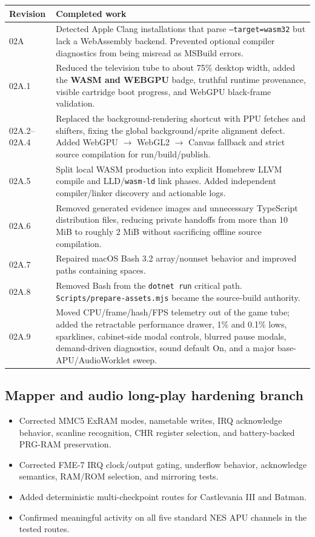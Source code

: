 \documentclass[10pt,letterpaper]{article}
\newcommand{\code}[1]{\texttt{\small #1}}
\begin{document}
\begin{longtable}{p{1.05in}p{6.2in}}
\toprule
Revision & Completed work \\
\midrule
\endhead
02A & Detected Apple Clang installations that parse \code{--target=wasm32} but lack a WebAssembly backend. Prevented optional compiler diagnostics from being misread as MSBuild errors. \\
02A.1 & Reduced the television tube to about 75\% desktop width, added the \textbf{WASM and WEBGPU} badge, truthful runtime provenance, visible cartridge boot progress, and WebGPU black-frame validation. \\
02A.2--02A.4 & Replaced the background-rendering shortcut with PPU fetches and shifters, fixing the global background/sprite alignment defect. Added WebGPU $\rightarrow$ WebGL2 $\rightarrow$ Canvas fallback and strict source compilation for run/build/publish. \\
02A.5 & Split local WASM production into explicit Homebrew LLVM compile and LLD/\code{wasm-ld} link phases. Added independent compiler/linker discovery and actionable logs. \\
02A.6 & Removed generated evidence images and unnecessary TypeScript distribution files, reducing private handoffs from more than 10 MiB to roughly 2 MiB without sacrificing offline source compilation. \\
02A.7 & Repaired macOS Bash 3.2 array/nounset behavior and improved paths containing spaces. \\
02A.8 & Removed Bash from the \code{dotnet run} critical path. \code{Scripts/prepare-assets.mjs} became the source-build authority. \\
02A.9 & Moved CPU/frame/hash/FPS telemetry out of the game tube; added the retractable performance drawer, 1\% and 0.1\% lows, sparklines, cabinet-side modal controls, blurred pause modals, demand-driven diagnostics, sound default On, and a major base-APU/AudioWorklet sweep. \\
\bottomrule
\end{longtable}

\subsection{Mapper and audio long-play hardening branch}
\begin{itemize}
\item Corrected MMC5 ExRAM modes, nametable writes, IRQ acknowledge behavior, scanline recognition, CHR register selection, and battery-backed PRG-RAM preservation.
\item Corrected FME-7 IRQ clock/output gating, underflow behavior, acknowledge semantics, RAM/ROM selection, and mirroring tests.
\item Added deterministic multi-checkpoint routes for Castlevania III and Batman.
\item Confirmed meaningful activity on all five standard NES APU channels in the tested routes.
\end{itemize}
\end{document}
